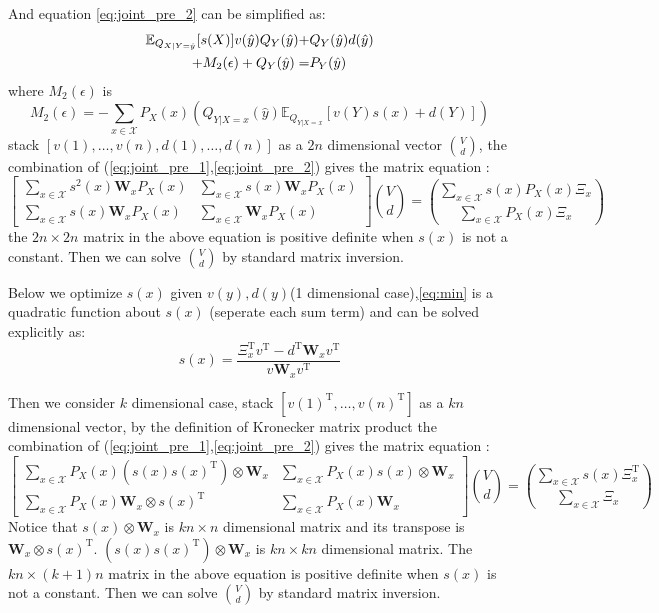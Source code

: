 \documentclass{article}
\def\T{\mathrm{T}}
\def\E{\mathbb{E}}
\begin{document}
And equation \eqref{eq:joint_pre_2} can be simplified as:
\begin{align}\notag
\E_{Q_{X|Y=\hat{y}}}[s(X)]v(\hat{y})Q_Y(\hat{y})+&Q_Y(\hat{y})d(\hat{y}) \\
+M_2(\epsilon)+Q_Y(\hat{y})=& P_Y(\hat{y})\label{eq:joint_simplify_2}
\end{align}
where $M_2(\epsilon)$ is
$$
M_2(\epsilon)=-\sum_{x\in \mathcal{X}}P_X(x)\left(Q_{Y|X=x}(\hat{y})\E_{Q_{Y|X=x}}[v(Y)s(x)+d(Y)]\right)
$$
stack $[v(1),\dots,v(n),d(1),\dots,d(n)]$ as a $2n$ dimensional vector $\binom{V}{d}$, the combination of (\ref{eq:joint_pre_1},\ref{eq:joint_pre_2}) gives
the matrix equation :
\begin{equation}\label{eq:MVd}
\begin{bmatrix}
\sum_{x\in \mathcal{X}} s^2(x)\bm{W}_xP_X(x) & \sum_{x\in \mathcal{X}} s(x)\bm{W}_xP_X(x) \\
\sum_{x\in \mathcal{X}} s(x)\bm{W}_xP_X(x) & \sum_{x\in \mathcal{X}} \bm{W}_xP_X(x)
\end{bmatrix}\binom{V}{d}=\binom{\sum_{x\in \mathcal{X}}s(x)P_X(x)\Xi_x}{\sum_{x\in \mathcal{X}}P_X(x)\Xi_x}
\end{equation}
the $2n\times 2n$ matrix in the above equation is positive definite when $s(x)$ is not a constant. Then we can solve $\binom{V}{d}$ by standard matrix inversion.

Below we optimize $s(x)$ given $v(y),d(y)$(1 dimensional case),\eqref{eq:min} is a quadratic function about $s(x)$ (seperate each sum term) and can be solved
explicitly as:
\begin{equation}
s(x)=\frac{\Xi_x^\T v^\T -d^\T \bm{W}_x v^\T}{v\bm{W}_xv^\T}
\end{equation}


Then we consider $k$ dimensional case, stack $[v(1)^\T,\dots,v(n)^\T]$ as a $kn$ dimensional vector, by the definition of Kronecker matrix product 
the combination of (\ref{eq:joint_pre_1},\ref{eq:joint_pre_2}) gives
the matrix equation :
\begin{equation}
\begin{bmatrix}
\sum_{x\in \mathcal{X}} P_X(x) (s(x)s(x)^\T)\otimes \bm{W}_x & \sum_{x\in \mathcal{X}} P_X(x) s(x)\otimes \bm{W}_x \\
\sum_{x\in \mathcal{X}} P_X(x) \bm{W}_x\otimes s(x)^\T & \sum_{x\in \mathcal{X}} P_X(x)\bm{W}_x
\end{bmatrix}\binom{V}{d}=\binom{\sum_{x\in \mathcal{X}}s(x)\Xi_x^\T}{\sum_{x\in \mathcal{X}}\Xi_x}
\end{equation}
Notice that $s(x)\otimes \bm{W}_x$ is $kn\times n$ dimensional matrix and its transpose is $\bm{W}_x \otimes s(x)^\T$.
$(s(x)s(x)^\T)\otimes \bm{W}_x$ is $kn \times kn$ dimensional matrix.
The $kn\times (k+1)n$ matrix in the above equation is positive definite when $s(x)$ is not a constant. Then we can solve $\binom{V}{d}$ by standard matrix inversion.
\end{document}

